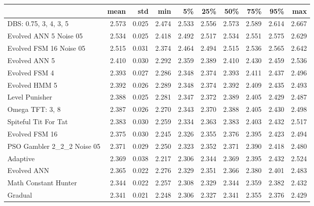 \begin{tabular}{lrrrrrrrrr}
\toprule
{} &   mean &    std &    min &     5\% &    25\% &    50\% &    75\% &    95\% &    max \\
\midrule
DBS: 0.75, 3, 4, 3, 5      &  2.573 &  0.025 &  2.474 &  2.533 &  2.556 &  2.573 &  2.589 &  2.614 &  2.667 \\
Evolved ANN 5 Noise 05     &  2.534 &  0.025 &  2.418 &  2.492 &  2.517 &  2.534 &  2.551 &  2.575 &  2.629 \\
Evolved FSM 16 Noise 05    &  2.515 &  0.031 &  2.374 &  2.464 &  2.494 &  2.515 &  2.536 &  2.565 &  2.642 \\
Evolved ANN 5              &  2.410 &  0.030 &  2.292 &  2.359 &  2.389 &  2.410 &  2.430 &  2.459 &  2.536 \\
Evolved FSM 4              &  2.393 &  0.027 &  2.286 &  2.348 &  2.374 &  2.393 &  2.411 &  2.437 &  2.496 \\
Evolved HMM 5              &  2.392 &  0.026 &  2.289 &  2.348 &  2.374 &  2.392 &  2.409 &  2.435 &  2.493 \\
Level Punisher             &  2.388 &  0.025 &  2.281 &  2.347 &  2.372 &  2.389 &  2.405 &  2.429 &  2.487 \\
Omega TFT: 3, 8            &  2.387 &  0.026 &  2.270 &  2.343 &  2.370 &  2.388 &  2.405 &  2.430 &  2.498 \\
Spiteful Tit For Tat       &  2.383 &  0.030 &  2.259 &  2.334 &  2.363 &  2.383 &  2.403 &  2.432 &  2.517 \\
Evolved FSM 16             &  2.375 &  0.030 &  2.245 &  2.326 &  2.355 &  2.376 &  2.395 &  2.423 &  2.494 \\
PSO Gambler 2\_2\_2 Noise 05 &  2.371 &  0.029 &  2.250 &  2.323 &  2.352 &  2.371 &  2.390 &  2.418 &  2.480 \\
Adaptive                   &  2.369 &  0.038 &  2.217 &  2.306 &  2.344 &  2.369 &  2.395 &  2.432 &  2.524 \\
Evolved ANN                &  2.365 &  0.022 &  2.276 &  2.329 &  2.351 &  2.366 &  2.380 &  2.401 &  2.483 \\
Math Constant Hunter       &  2.344 &  0.022 &  2.257 &  2.308 &  2.329 &  2.344 &  2.359 &  2.382 &  2.432 \\
Gradual                    &  2.341 &  0.021 &  2.248 &  2.306 &  2.327 &  2.341 &  2.355 &  2.376 &  2.429 \\
\bottomrule
\end{tabular}
